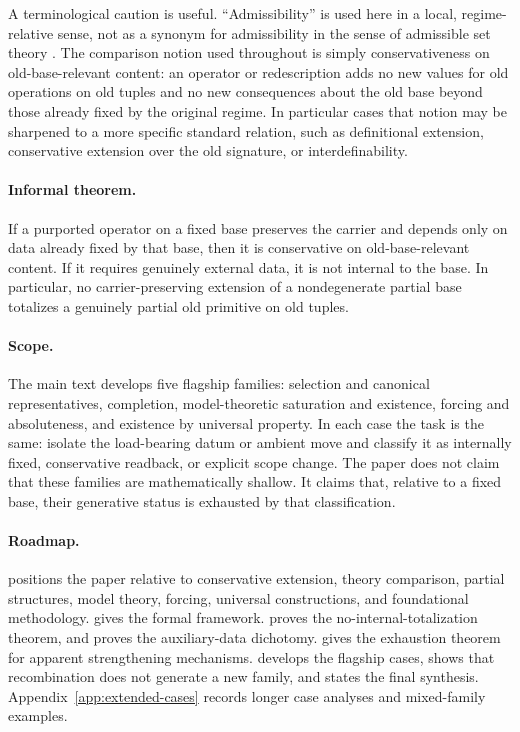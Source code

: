 A terminological caution is useful. ``Admissibility'' is used here in a local, regime-relative sense, not as a synonym for admissibility in the sense of admissible set theory \citep{Barwise1975}. The comparison notion used throughout is simply conservativeness on old-base-relevant content: an operator or redescription adds no new values for old operations on old tuples and no new consequences about the old base beyond those already fixed by the original regime. In particular cases that notion may be sharpened to a more specific standard relation, such as definitional extension, conservative extension over the old signature, or interdefinability.

\paragraph*{Informal theorem.}
If a purported operator on a fixed base preserves the carrier and depends only on data already fixed by that base, then it is conservative on old-base-relevant content. If it requires genuinely external data, it is not internal to the base. In particular, no carrier-preserving extension of a nondegenerate partial base totalizes a genuinely partial old primitive on old tuples.

\paragraph*{Scope.}
The main text develops five flagship families: selection and canonical representatives, completion, model-theoretic saturation and existence, forcing and absoluteness, and existence by universal property. In each case the task is the same: isolate the load-bearing datum or ambient move and classify it as internally fixed, conservative readback, or explicit scope change. The paper does not claim that these families are mathematically shallow. It claims that, relative to a fixed base, their generative status is exhausted by that classification.

\paragraph*{Roadmap.}
 positions the paper relative to conservative extension, theory comparison, partial structures, model theory, forcing, universal constructions, and foundational methodology.  gives the formal framework.  proves the no-internal-totalization theorem, and  proves the auxiliary-data dichotomy.  gives the exhaustion theorem for apparent strengthening mechanisms.  develops the flagship cases,  shows that recombination does not generate a new family, and  states the final synthesis. Appendix~\ref{app:extended-cases} records longer case analyses and mixed-family examples.
